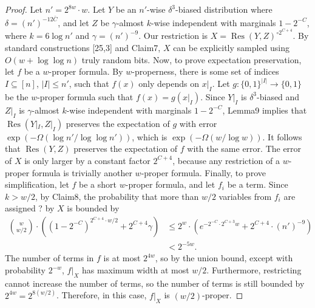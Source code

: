 \begin{proof}
Let $n'=2^{8w}\cdot w$. Let $Y$ be an $n'$-wise $\delta^3$-biased distribution where $\delta=(n')^{-12\bar C}$, and let $Z$ be $\gamma$-almost $k$-wise independent with marginals $1-2^{-C}$, where $k=6\log n'$ and $\gamma=(n')^{-9}$. Our restriction is $X=\operatorname{Res}(Y,Z)^{\circ2^{C+4}}$.
By standard constructions [25,3] and Claim7, $X$ can be explicitly sampled using $O(w+\log\log n)$ truly random bits.
Now, to prove expectation preservation, let $f$ be a $w$-proper formula. By $w$-properness, there is some set of indices $I\subseteq[n]$, $|I|\le n'$, such that $f(x)$ only depends on $x|_I$. Let $g:\{0,1\}^{|I|}\to\{0,1\}$ be the $w$-proper formula such that $f(x)=g(x|_I)$. Since $Y|_I$ is $\delta^3$-biased and $Z|_I$ is $\gamma$-almost $k$-wise independent with marginals $1-2^{-C}$, Lemma9 implies that $\operatorname{Res}(Y|_I,Z|_I)$ preserves the expectation of $g$ with error $\exp(-\Omega(\log n'/\log\log n'))$, which is $\exp(-\Omega(w/\log w))$. It follows that $\operatorname{Res}(Y,Z)$ preserves the expectation of $f$ with the same error. The error of $X$ is only larger by a constant factor $2^{C+4}$, because any restriction of a $w$-proper formula is trivially another $w$-proper formula.
Finally, to prove simplification, let $f$ be a short $w$-proper formula, and let $f_i$ be a term. Since $k>w/2$, by Claim8, the probability that more than $w/2$ variables from $f_i$ are assigned ? by $X$ is bounded by
\begin{align*}
\binom w{w/2}\cdot((1-2^{-C})^{2^{C+4}\cdot w/2}+2^{C+4}\gamma)
&\le2^w\cdot(e^{-2^{-C}\cdot2^{C+3}w}+2^{C+4}\cdot(n')^{-9})\\
&<2^{-5w}.
\end{align*}
The number of terms in $f$ is at most $2^{4w}$, so by the union bound, except with probability $2^{-w}$, $f|_X$ has maximum width at most $w/2$. Furthermore, restricting cannot increase the number of terms, so the number of terms is still bounded by $2^{4w}=2^{8(w/2)}$. Therefore, in this case, $f|_X$ is $(w/2)$-proper.
\end{proof}
